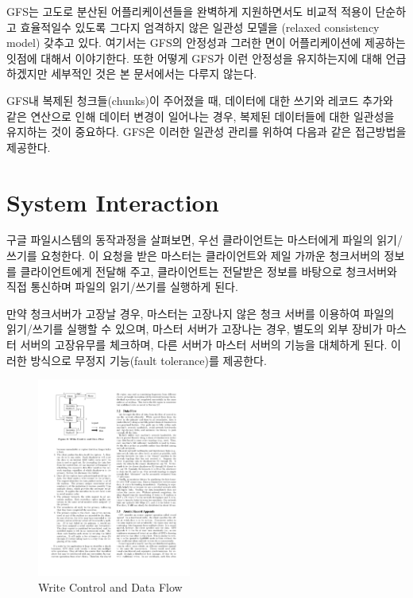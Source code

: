 \documentclass[twocolumn]{article}
\begin{document}
 GFS는  고도로 분산된 어플리케이션들을 완벽하게 지원하면서도 비교적 적용이 단순하고 효율적일수 있도록 그다지 엄격하지 않은 일관성 모델을 (relaxed consistency model) 갖추고 있다.  여기서는 GFS의 안정성과 그러한 면이 어플리케이션에 제공하는 잇점에 대해서 이야기한다.  또한 어떻게 GFS가 이런 안정성을 유지하는지에 대해 언급하겠지만 세부적인 것은 본 문서에서는 다루지 않는다.

GFS내 복제된 청크들(chunks)이 주어졌을 때, 데이터에 대한 쓰기와 레코드 추가와 같은 연산으로 인해 데이터 변경이 일어나는 경우,  복제된 데이터들에 대한 일관성을 유지하는 것이 중요하다. GFS은 이러한 일관성 관리를 위하여 다음과 같은 접근방법을 제공한다.

\section{System Interaction}
구글 파일시스템의 동작과정을 살펴보면, 우선 클라이언트는 마스터에게 파일의 읽기/쓰기를 요청한다. 이 요청을 받은 마스터는 클라이언트와 제일 가까운 청크서버의 정보를 클라이언트에게 전달해 주고, 클라이언트는 전달받은 정보를 바탕으로 청크서버와 직접 통신하며 파일의 읽기/쓰기를 실행하게 된다.

만약 청크서버가 고장날 경우, 마스터는 고장나지 않은 청크 서버를 이용하여 파일의 읽기/쓰기를 실행할 수 있으며, 마스터 서버가 고장나는 경우, 별도의 외부 장비가 마스터 서버의 고장유무를 체크하며, 다른 서버가 마스터 서버의 기능을 대체하게 된다. 이러한 방식으로 무정지 기능(fault tolerance)를 제공한다.

\begin{figure}[htb]
        \centering
        \includegraphics[width=0.45\textwidth]{process}
        \caption{Write Control and Data Flow}
        \label{fig:writecontrol}
\end{figure}
\end{document}
